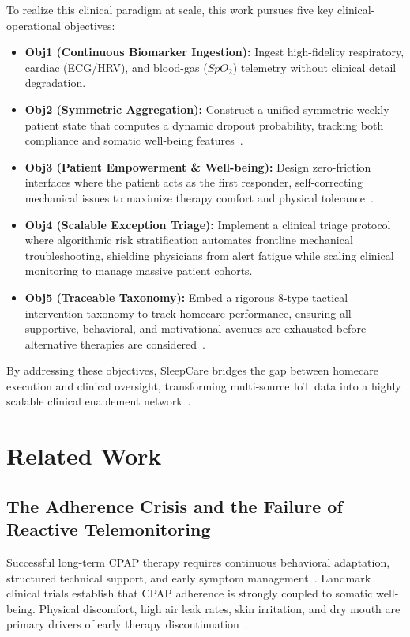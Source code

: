 \documentclass[conference]{IEEEtran}
\begin{document}
To realize this clinical paradigm at scale, this work pursues five key clinical-operational objectives:
\begin{itemize}
\item \textbf{Obj1 (Continuous Biomarker Ingestion):} Ingest high-fidelity respiratory, cardiac (ECG/HRV), and blood-gas ($SpO_2$) telemetry without clinical detail degradation.
\item \textbf{Obj2 (Symmetric Aggregation):} Construct a unified symmetric weekly patient state that computes a dynamic dropout probability, tracking both compliance and somatic well-being features~\cite{kakaei2024bhi,kakaei2025skima}.
\item \textbf{Obj3 (Patient Empowerment & Well-being):} Design zero-friction interfaces where the patient acts as the first responder, self-correcting mechanical issues to maximize therapy comfort and physical tolerance~\cite{dowding2015}.
\item \textbf{Obj4 (Scalable Exception Triage):} Implement a clinical triage protocol where algorithmic risk stratification automates frontline mechanical troubleshooting, shielding physicians from alert fatigue while scaling clinical monitoring to manage massive patient cohorts.
\item \textbf{Obj5 (Traceable Taxonomy):} Embed a rigorous 8-type tactical intervention taxonomy to track homecare performance, ensuring all supportive, behavioral, and motivational avenues are exhausted before alternative therapies are considered~\cite{kakaei2024bhi}.
\end{itemize}

By addressing these objectives, SleepCare bridges the gap between homecare execution and clinical oversight, transforming multi-source IoT data into a highly scalable clinical enablement network~\cite{kakaei2025cbms}.

\section{Related Work}

\subsection{The Adherence Crisis and the Failure of Reactive Telemonitoring}
Successful long-term CPAP therapy requires continuous behavioral adaptation, structured technical support, and early symptom management~\cite{weaver2008,epstein2009}. Landmark clinical trials establish that CPAP adherence is strongly coupled to somatic well-being. Physical discomfort, high air leak rates, skin irritation, and dry mouth are primary drivers of early therapy discontinuation~\cite{sawyer2011}. 
\end{document}
